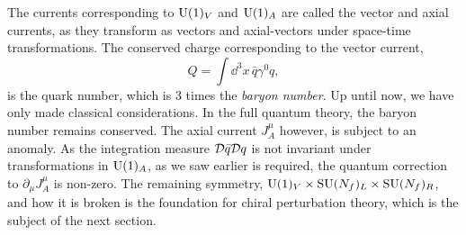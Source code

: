 The currents corresponding to $\mathrm{U}(1)_V$ and $\mathrm{U}(1)_A$ are called the vector and axial currents, as they transform as vectors and axial-vectors under space-time transformations.
The conserved charge corresponding to the vector current,
\begin{equation}
    Q = \int \dd^3 x \, \bar q \gamma^0 q,
\end{equation}
%
is the quark number, which is $3$ times the \emph{baryon number}.
Up until now, we have only made classical considerations.
In the full quantum theory, the baryon number remains conserved.
The axial current $J^\mu_A$ however, is subject to an anomaly.
As the integration measure $\mathcal{D}\bar q \mathcal{D} q$ is not invariant under transformations in $\mathrm{U}(1)_A$, as we saw earlier is required, the quantum correction to $\partial_\mu J^\mu_A$ is non-zero.
The remaining symmetry, $\mathrm{U}(1)_V \times \mathrm{SU}(N_f)_L \times \mathrm{SU}(N_f)_R$, and how it is broken is the foundation for chiral perturbation theory, which is the subject of the next section.
